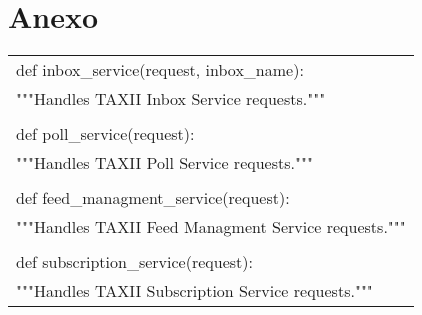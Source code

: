 \chapter{Anexo}
\label{anexo}
	
	\begin{center}
		\begin{tabular}{|l|}
			\hline
			def inbox\_service(request, inbox\_name): \\
			"""Handles TAXII Inbox Service requests.""" \\ \\
			
			def poll\_service(request):\ \\
			"""Handles TAXII Poll Service requests.""" \\ \\
			
			def feed\_managment\_service(request): \\
			"""Handles TAXII Feed Managment Service requests.""" \\ \\
			
			def subscription\_service(request):\ \\
			"""Handles TAXII Subscription Service requests.""" \\
			\hline
		\end{tabular}
	\end{center}\ \\
	
